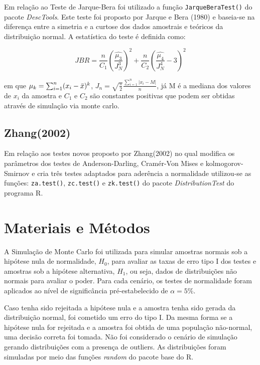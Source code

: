 \documentclass[a4paper,11pt]{article} %
\begin{document}
Em relação ao Teste de Jarque-Bera foi utilizado a função  \texttt{JarqueBeraTest()} do pacote \textit{DescTools}. Este teste foi proposto por Jarque e Bera (1980) e baseia-se na diferença entre a simetria e a curtose dos dados amostrais e teóricos da distribuição normal. A estatística do teste é definida como: 

\begin{equation}
    JBR = \frac{n}{C_{1}} \left( \frac{\hat{\mu_{3}}}{J^{3}_{N}}  \right)^{2} + \frac{n}{C_{2}} \left( \frac{ \hat{\mu_{4}}}{J^{4}_{N}} - 3 \right)^{2} 
\end{equation}


em que $\mu_{k} = \sum_{i=1}^{n} (x_{i}- \Bar{x})^{k}$, $J_{n} = \sqrt{\frac{\pi}{2}}\frac{\sum_{i=1}^{n}|x_{i}-M|}{n}$, já M é a mediana dos valores de $x_{i}$ da amostra e $C_{1}$ e $C_{2}$ são constantes positivas que podem ser obtidas através de simulação via monte carlo. \vskip0.3cm

\subsection{Zhang(2002)}

Em relação aos testes novos proposto por Zhang(2002) no qual modifica os parâmetros dos testes de Anderson-Darling, Cramér-Von Mises e kolmogorov-Smirnov e cria três testes adaptados para aderência a normalidade utilizou-se as funções: \texttt{za.test()}, \texttt{zc.test()} e \texttt{zk.test()} do pacote \textit{DistributionTest} do programa R.



\section{Materiais e Métodos}
A Simulação de Monte Carlo foi utilizada para simular amostras normais sob a hipótese nula de normalidade, $H_0$, para avaliar as taxas de erro tipo I dos testes e amostras sob a hipótese alternativa, $H_1$, ou seja, dados de distribuições não normais para avaliar o poder. Para cada cenário, os testes de normalidade foram aplicados ao nível de significância pré-estabelecido de $\alpha = 5\%$. \vskip0.3cm

Caso tenha sido rejeitada a hipótese nula e a amostra tenha sido gerada da distribuição normal, foi cometido um erro do tipo I. Da mesma forma se a hipótese nula for rejeitada e a amostra foi obtida de uma população não-normal, uma decisão correta foi tomada. Não foi considerado o cenário de simulação gerando distribuições com a presença de outliers. As distribuições foram simuladas por meio das funções \textit{random} do pacote base do R.
\end{document}
